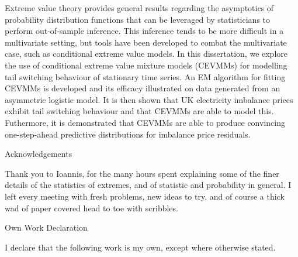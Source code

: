 \documentclass[11pt,twoside,openany]{book}
\numberwithin{Theorem}{chapter}
\numberwithin{Definition}{chapter}
\numberwithin{Lemma}{chapter}
\numberwithin{Algorithm}{chapter}
\numberwithin{equation}{chapter}
\begin{document}
Extreme value theory provides general results regarding the asymptotics of
probability distribution functions that can be leveraged by statisticians to
perform out-of-sample inference. This inference tends to be more difficult in a
multivariate setting, but tools have been developed to combat the multivariate
case, such as conditional extreme value models. In this dissertation, we explore
the use of conditional extreme value mixture models (CEVMMs) for modelling
tail switching behaviour of stationary time series.
An EM algorithm for fitting  CEVMMs is developed and its efficacy
illustrated on data generated from an asymmetric logistic model.
It is then shown that UK electricity imbalance prices exhibit tail switching
behaviour and that CEVMMs are able to model this. Futhermore,
it is demonstrated that CEVMMs are able to produce convincing one-step-ahead
predictive distributions for imbalance price residuals.




\clearpage

\begin{center}
\Large{Acknowledgements}
\end{center}

Thank you to Ioannis, for the many hours spent explaining some of the finer
details of the statistics of extremes, and of statistic and probability in
general. I left every meeting with fresh problems, new ideas to try, and of course a
thick wad of paper covered head to toe with scribbles.

\clearpage

\begin{center}
\Large{Own Work Declaration}
\end{center}

I declare that the following work is my own, except where otherwise stated.



\clearpage



\pagestyle{memo}
\end{document}
